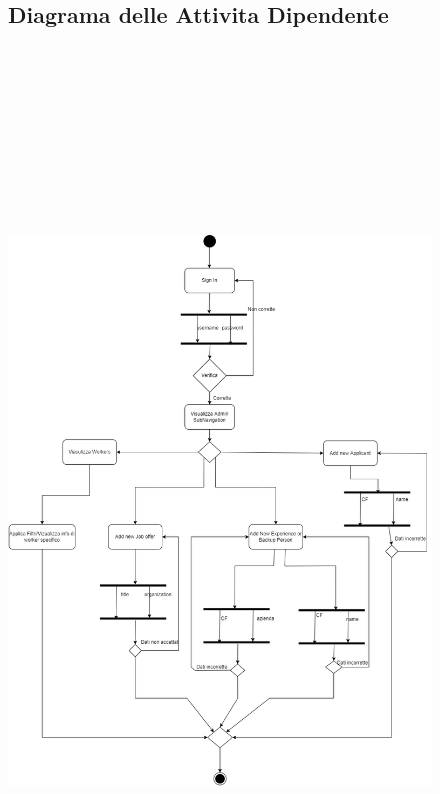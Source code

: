 \documentclass[ 4paper,11pt,openany]{book}
\begin{document}
\begin{figure}[htpb!] 
	\subsection{Diagrama delle Attivita Dipendente}
	\includegraphics[height=245mm,width=180mm]{Activity_Diagram.png}
\end{figure}

	
	
\end{document}
